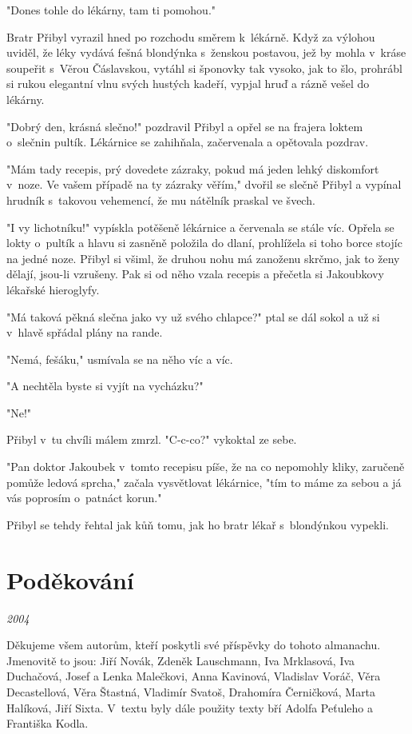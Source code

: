 \documentclass[a5paper, 11pt, twoside]{article}
\begin{document}
"Dones tohle do lékárny, tam ti pomohou."

Bratr Přibyl vyrazil hned po rozchodu směrem k~lékárně. Když za výlohou
uviděl, že léky vydává fešná blondýnka s~ženskou postavou, jež by mohla
v~kráse soupeřit s~Věrou Čáslavskou, vytáhl si šponovky tak vysoko, jak
to šlo, prohrábl si rukou elegantní vlnu svých hustých kadeří, vypjal
hruď a rázně vešel do lékárny.

"Dobrý den, krásná slečno!{}" pozdravil Přibyl a opřel se na frajera
loktem o~slečnin pultík. Lékárnice se zahihňala, začervenala a opětovala
pozdrav.

"Mám tady recepis, prý dovedete zázraky, pokud má jeden lehký diskomfort
v~noze. Ve vašem případě na ty zázraky věřím," dvořil se slečně Přibyl
a vypínal hrudník s~takovou vehemencí, že mu nátělník praskal ve švech.

"I vy lichotníku!{}" vypískla potěšeně lékárnice a červenala se stále
víc. Opřela se lokty o~pultík a hlavu si zasněně položila do dlaní,
prohlížela si toho borce stojíc na jedné noze. Přibyl si všiml, že
druhou nohu má zanoženu skrčmo, jak to ženy dělají, jsou-li vzrušeny.
Pak si od něho vzala recepis a přečetla si Jakoubkovy lékařské
hieroglyfy.

"Má taková pěkná slečna jako vy už svého chlapce?{}" ptal se dál sokol
a už si v~hlavě spřádal plány na rande.

"Nemá, fešáku," usmívala se na něho víc a víc.

"A nechtěla byste si vyjít na vycházku?{}"

"Ne!{}"

Přibyl v~tu chvíli málem zmrzl. "C-c-co?{}" vykoktal ze sebe.

"Pan doktor Jakoubek v~tomto recepisu píše, že na co nepomohly kliky,
zaručeně pomůže ledová sprcha," začala vysvětlovat lékárnice, "tím to
máme za sebou a já vás poprosím o~patnáct korun."

Přibyl se tehdy řehtal jak kůň tomu, jak ho bratr lékař s~blondýnkou
vypekli.

\section{Poděkování}

\textit{2004}

Děkujeme všem autorům, kteří poskytli své příspěvky do tohoto almanachu.
Jmenovitě to jsou: Jiří Novák, Zdeněk Lauschmann, Iva Mrklasová, Iva
Duchačová, Josef a Lenka Malečkovi, Anna Kavinová, Vladislav Voráč, Věra
Decastellová, Věra Štastná, Vladimír Svatoš, Drahomíra Černičková, Marta
Halíková, Jiří Sixta. V~textu byly dále použity texty bří Adolfa
Peťuleho a Františka Kodla.
\end{document}
